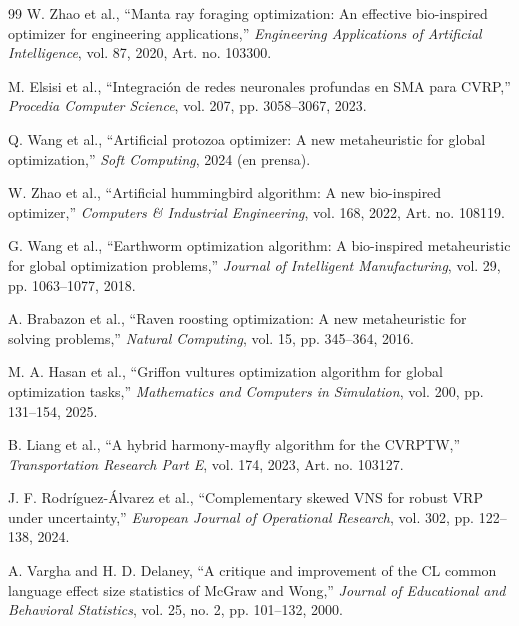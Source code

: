 \documentclass[10pt,a4paper]{extarticle}
\begin{document}
\begin{thebibliography}{99}
 W. Zhao et al., ``Manta ray foraging optimization: An effective bio-inspired optimizer for engineering applications,'' \textit{Engineering Applications of Artificial Intelligence}, vol. 87, 2020, Art. no. 103300.

 M. Elsisi et al., ``Integración de redes neuronales profundas en SMA para CVRP,'' \textit{Procedia Computer Science}, vol. 207, pp. 3058--3067, 2023.

 Q. Wang et al., ``Artificial protozoa optimizer: A new metaheuristic for global optimization,'' \textit{Soft Computing}, 2024 (en prensa).

 W. Zhao et al., ``Artificial hummingbird algorithm: A new bio-inspired optimizer,'' \textit{Computers \& Industrial Engineering}, vol. 168, 2022, Art. no. 108119.

 G. Wang et al., ``Earthworm optimization algorithm: A bio-inspired metaheuristic for global optimization problems,'' \textit{Journal of Intelligent Manufacturing}, vol. 29, pp. 1063--1077, 2018.

 A. Brabazon et al., ``Raven roosting optimization: A new metaheuristic for solving problems,'' \textit{Natural Computing}, vol. 15, pp. 345--364, 2016.

 M. A. Hasan et al., ``Griffon vultures optimization algorithm for global optimization tasks,'' \textit{Mathematics and Computers in Simulation}, vol. 200, pp. 131--154, 2025.

 B. Liang et al., ``A hybrid harmony-mayfly algorithm for the CVRPTW,'' \textit{Transportation Research Part E}, vol. 174, 2023, Art. no. 103127.

 J. F. Rodríguez-Álvarez et al., ``Complementary skewed VNS for robust VRP under uncertainty,'' \textit{European Journal of Operational Research}, vol. 302, pp. 122--138, 2024.

 A. Vargha and H. D. Delaney, ``A critique and improvement of the CL common language effect size statistics of McGraw and Wong,'' \textit{Journal of Educational and Behavioral Statistics}, vol. 25, no. 2, pp. 101--132, 2000.

\end{thebibliography}
\end{document}
